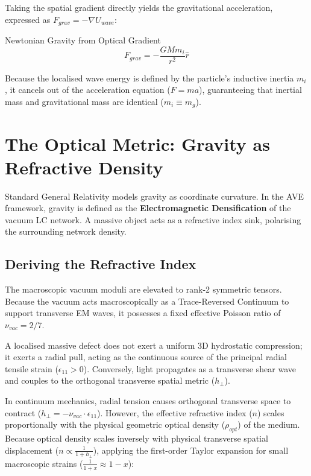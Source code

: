 Taking the spatial gradient directly yields the gravitational acceleration, expressed as $F_{grav}=-\nabla U_{wave}$:

\begin{resultbox}{Newtonian Gravity from Optical Gradient}
\begin{equation}
F_{grav}=-\frac{GM m_i}{r^{2}}\hat{r}
\end{equation}
\end{resultbox}

Because the localised wave energy is defined by the particle's inductive inertia $m_i$, it cancels out of the acceleration equation ($F=ma$), guaranteeing that inertial mass and gravitational mass are identical ($m_i\equiv m_g$).

\section{The Optical Metric: Gravity as Refractive Density}
\label{sec:optical_metric}

Standard General Relativity models gravity as coordinate curvature. In the AVE framework, gravity is defined as the \textbf{Electromagnetic Densification} of the vacuum LC network. A massive object acts as a refractive index sink, polarising the surrounding network density.

\subsection{Deriving the Refractive Index}

The macroscopic vacuum moduli are elevated to rank-2 symmetric tensors. Because the vacuum acts macroscopically as a Trace-Reversed Continuum to support transverse EM waves, it possesses a fixed effective Poisson ratio of $\nu_{vac}=2/7$. 

A localised massive defect does not exert a uniform 3D hydrostatic compression; it exerts a radial pull, acting as the continuous source of the principal radial tensile strain ($\epsilon_{11} > 0$). Conversely, light propagates as a transverse shear wave and couples to the orthogonal transverse spatial metric ($h_{\perp}$). 

In continuum mechanics, radial tension causes orthogonal transverse space to contract ($h_{\perp} = -\nu_{vac} \cdot \epsilon_{11}$). However, the effective refractive index ($n$) scales proportionally with the physical geometric optical density ($\rho_{opt}$) of the medium. Because optical density scales inversely with physical transverse spatial displacement ($n \propto \frac{1}{1 + h_{\perp}}$), applying the first-order Taylor expansion for small macroscopic strains ($\frac{1}{1+x} \approx 1-x$): 

